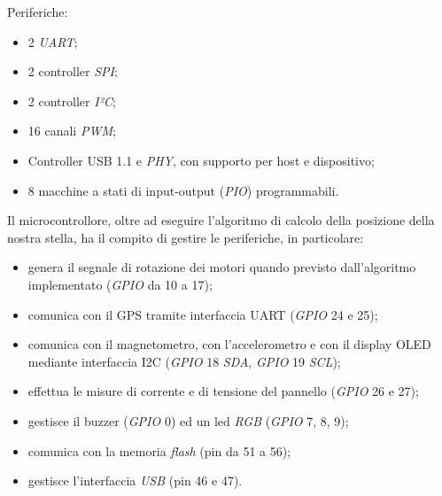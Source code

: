 \noindent Periferiche:

\begin{itemize}
\item
  
  2 \emph{UART};
  
\item
  
  2 controller \emph{SPI};
  
\item
  
  2 controller \emph{I²C};
  
\item
  
  16 canali \emph{PWM};
  
\item
  
  Controller USB 1.1 e \emph{PHY}, con supporto per host e dispositivo;
  
\item
  
  8 macchine a stati di input-output (\emph{PIO}) programmabili.
  
\end{itemize}

\noindent Il microcontrollore, oltre ad eseguire l'algoritmo di calcolo della 
posizione della nostra stella, ha il compito di gestire le periferiche, in
particolare:

\begin{itemize}
\item
  
  genera il segnale di rotazione dei motori quando previsto
  dall'algoritmo implementato (\emph{GPIO} da 10 a 17);
  
\item
  
  comunica con il GPS tramite interfaccia UART (\emph{GPIO} 24 e 25);
  
\item
  
  comunica con il magnetometro, con l'accelerometro e con il display
  OLED mediante interfaccia I2C (\emph{GPIO} 18 \emph{SDA}, \emph{GPIO}
  19 \emph{SCL});
  
\item
  
  effettua le misure di corrente e di tensione del pannello (\emph{GPIO}
  26 e 27);
  
\item
  
  gestisce il buzzer (\emph{GPIO} 0) ed un led \emph{RGB} (\emph{GPIO}
  7, 8, 9);
  
\item
  
  comunica con la memoria \emph{flash} (pin da 51 a 56);
  
\item
  
  gestisce l'interfaccia \emph{USB} (pin 46 e 47).
  
\end{itemize}

